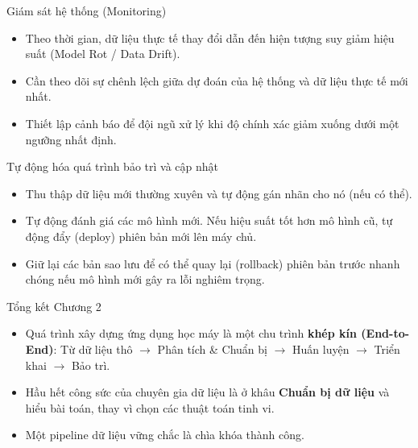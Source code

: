 \documentclass[aspectratio=169]{beamer}
\begin{document}
\begin{frame}{Giám sát hệ thống (Monitoring)}
\begin{itemize}
    \item Theo thời gian, dữ liệu thực tế thay đổi dẫn đến hiện tượng suy giảm hiệu suất (Model Rot / Data Drift).
    \item Cần theo dõi sự chênh lệch giữa dự đoán của hệ thống và dữ liệu thực tế mới nhất.
    \item Thiết lập cảnh báo để đội ngũ xử lý khi độ chính xác giảm xuống dưới một ngưỡng nhất định.
\end{itemize}
\end{frame}

\begin{frame}{Tự động hóa quá trình bảo trì và cập nhật}
\begin{itemize}
    \item Thu thập dữ liệu mới thường xuyên và tự động gán nhãn cho nó (nếu có thể).
    \item Tự động đánh giá các mô hình mới. Nếu hiệu suất tốt hơn mô hình cũ, tự động đẩy (deploy) phiên bản mới lên máy chủ.
    \item Giữ lại các bản sao lưu để có thể quay lại (rollback) phiên bản trước nhanh chóng nếu mô hình mới gây ra lỗi nghiêm trọng.
\end{itemize}
\end{frame}

\begin{frame}{Tổng kết Chương 2}
\begin{itemize}
    \item Quá trình xây dựng ứng dụng học máy là một chu trình \textbf{khép kín (End-to-End)}: Từ dữ liệu thô $\rightarrow$ Phân tích \& Chuẩn bị $\rightarrow$ Huấn luyện $\rightarrow$ Triển khai $\rightarrow$ Bảo trì.
    \item Hầu hết công sức của chuyên gia dữ liệu là ở khâu \textbf{Chuẩn bị dữ liệu} và hiểu bài toán, thay vì chọn các thuật toán tinh vi.
    \item Một pipeline dữ liệu vững chắc là chìa khóa thành công.
\end{itemize}
\end{frame}
\end{document}
